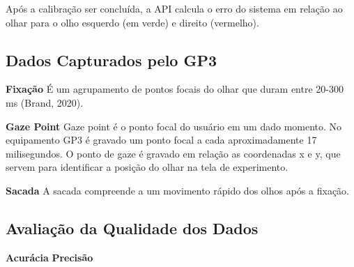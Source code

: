 Após a calibração ser concluída, a API calcula o erro do sistema em relação ao olhar para o olho esquerdo (em verde) 
e direito (vermelho). 

\subsection{Dados Capturados pelo GP3}

\textbf{Fixação} É um agrupamento de pontos focais do olhar que duram entre 20-300 ms (Brand, 2020).

\textbf{Gaze Point} Gaze point é o ponto focal do usuário em um dado momento. No equipamento GP3 é gravado um ponto focal a cada aproximadamente 17 milisegundos.
O ponto de gaze é gravado em relação as coordenadas x e y, que servem para identificar a posição do olhar na tela de experimento. 

\textbf{Sacada} A sacada compreende a um movimento rápido dos olhos após a fixação.

\subsection{Avaliação da Qualidade dos Dados}
\textbf{Acurácia}
\textbf{Precisão}



\subsection{}